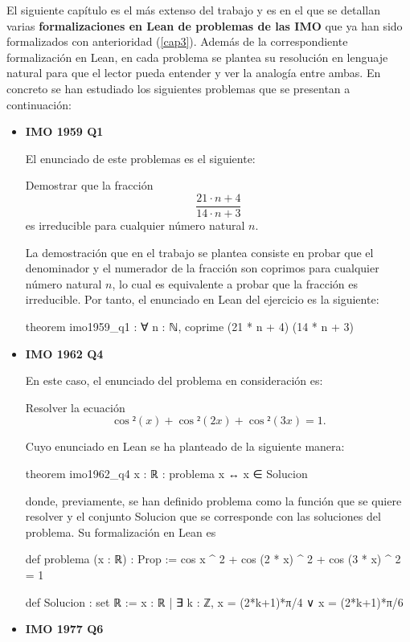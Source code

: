 El siguiente capítulo es el más extenso del trabajo y es en el que se
detallan varias \textbf{formalizaciones en Lean de problemas de las IMO}
que ya han sido formalizados con anterioridad (\ref{cap3}). Además de la
correspondiente formalización en Lean, en cada problema se plantea su
resolución en lenguaje natural para que el lector pueda entender y ver
la analogía entre ambas. En concreto se han estudiado los siguientes
problemas que se presentan a continuación:
\begin{itemize}
\item \textbf{IMO 1959 Q1}

  El enunciado de este problemas es el siguiente:

  Demostrar que la fracción
  \[\frac{21⋅n+4}{14⋅n+3}\]
  es irreducible para cualquier número natural \(n\).

  La demostración que en el trabajo se plantea consiste en probar que el
  denominador y el numerador de la fracción son coprimos para cualquier
  número natural \(n\), lo cual es equivalente a probar que la fracción
  es irreducible. Por tanto, el enunciado en Lean del ejercicio es la
  siguiente:
  \begin{leancode}
  theorem imo1959_q1 : ∀ n : ℕ, coprime (21 * n + 4) (14 * n + 3)
  \end{leancode}

\item \textbf{IMO 1962 Q4}

  En este caso, el enunciado del problema en consideración es:

  Resolver la ecuación
  \[\cos²(x)+\cos²(2x)+\cos²(3x)=1. \]

  Cuyo enunciado en Lean se ha planteado de la siguiente manera:

  \begin{leancode}
  theorem imo1962_q4
    {x : ℝ}
    : problema x ↔ x ∈ Solucion
  \end{leancode}
  donde, previamente, se han definido problema como la función que se
  quiere resolver y el conjunto Solucion que se corresponde con las
  soluciones del problema. Su formalización en Lean es
  \begin{leancode}
  def problema (x : ℝ) : Prop :=
    cos x ^ 2 + cos (2 * x) ^ 2 + cos (3 * x) ^ 2 = 1

  def Solucion : set ℝ :=
    {x : ℝ | ∃ k : ℤ, x = (2*k+1)*π/4 ∨ x = (2*k+1)*π/6}
  \end{leancode}

\item \textbf{IMO 1977 Q6}


\end{itemize}
